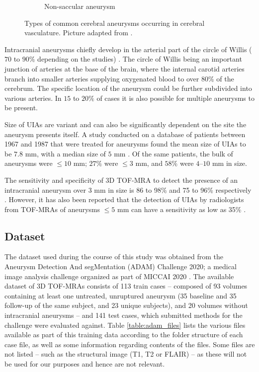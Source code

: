 \begin{figure}[h]
\begin{subfigure}{.45\linewidth}
		\caption[Non-saccular aneurysm]{Non-saccular aneurysm}
	\end{subfigure}
	\caption[Types of aneurysms.]{Types of common cerebral aneurysms occurring in cerebral vasculature. Picture adapted from \citeauthor{Withers2013}.}
	\label{fig:aneurysms.png}
\end{figure}

Intracranial aneurysms chiefly develop in the arterial part of the circle of Willis ($70$ to $90\%$ depending on the studies) \cite{Rodriguez-Regent2014}. The circle of Willis being an important junction of arteries at the base of the brain, where the internal carotid arteries branch into smaller arteries supplying oxygenated blood to over $80\%$ of the cerebrum. The specific location of the aneurysm could be further subdivided into various arteries. In $15$ to $20\%$ of cases it is also possible for multiple aneurysms to be present.

Size of UIAs are variant and can also be significantly dependent on the site the aneurysm presents itself. A study conducted on a database of patients between 1967 and 1987 that were treated for aneurysms found the mean size of UIAs to be $7.8$ mm, with a median size of $5$ mm \cite{Weir2002}. Of the same patients, the bulk of aneurysms were $\leq 10$ mm; $27\%$ were $\leq 3$ mm, and $58\%$ were $4$--$10$ mm in size.

The sensitivity and specificity of 3D TOF-MRA to detect the presence of an intracranial aneurysm over 3 mm in size is 86 to 98\% and 75 to 96\% respectively \cite{Sailer2014}. However, it has also been reported that the detection of UIAs by radiologists from TOF-MRAs of aneurysms $\leq 5$ mm can have a sensitivity as low as 35\% \cite{White2001}.

\subsection{Dataset}
The dataset used during the course of this study was obtained from the Aneurysm Detection And segMentation (ADAM) Challenge 2020; a medical image analysis challenge organized as part of MICCAI 2020 \cite{Timmins2020}. The available dataset of 3D TOF-MRAs consists of 113 train cases -- composed of 93 volumes containing at least one untreated, unruptured aneurysm (35 baseline and 35 follow-up of the same subject, and 23 unique subjects), and 20 volumes without intracranial aneurysms -- and 141 test cases, which submitted methods for the challenge were evaluated against. Table \ref{table:adam_files} lists the various files available as part of this training data according to the folder structure of each case file, as well as some information regarding contents of the files. Some files are not listed -- such as the structural image (T1, T2 or FLAIR) -- as these will not be used for our purposes and hence are not relevant.

